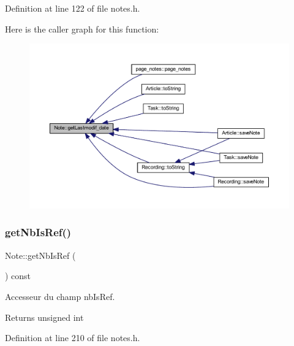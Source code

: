 Definition at line 122 of file notes.\+h.

Here is the caller graph for this function\+:\nopagebreak
\begin{figure}[H]
\begin{center}
\leavevmode
\includegraphics[width=350pt]{class_note_ab1811bb7017d2e1487c90f39b946d572_icgraph}
\end{center}
\end{figure}
\mbox{\label{class_note_adc7d55aa12e59b2c67f91bd7f02935d8}} 
\subsubsection{\texorpdfstring{get\+Nb\+Is\+Ref()}{getNbIsRef()}}
{\footnotesize\ttfamily Note\+::get\+Nb\+Is\+Ref (\begin{DoxyParamCaption}{ }\end{DoxyParamCaption}) const\hspace{0.3cm}{\ttfamily [inline]}}



Accesseur du champ nb\+Is\+Ref. 

\begin{DoxyReturn}{Returns}
unsigned int 
\end{DoxyReturn}


Definition at line 210 of file notes.\+h.

